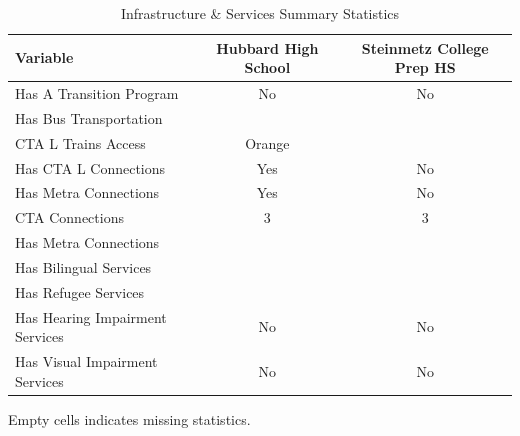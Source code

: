 \begin{table}[H]
\renewcommand{\arraystretch}{1.5}
\caption*{
{\large Infrastructure \& Services Summary Statistics}
} 

\fontsize{10pt}{11pt}\selectfont

\begin{tabular*}{\linewidth}{@{\extracolsep{\fill}}lcc}
\toprule
Variable & Hubbard High School & Steinmetz College Prep HS \\ 
\midrule\addlinespace[2.5pt]
Has A Transition Program & No & No \\
Has Bus Transportation &  &  \\
CTA L Trains Access & Orange &  \\
Has CTA L Connections & Yes & No \\
Has Metra Connections & Yes & No \\
CTA Connections & 3 & 3 \\
Has Metra Connections &  &  \\
Has Bilingual Services &  &  \\
Has Refugee Services &  &  \\
Has Hearing Impairment Services & No & No \\
Has Visual Impairment Services & No & No \\
\bottomrule
\end{tabular*}
\begin{minipage}{\linewidth}
Empty cells indicates missing statistics.\\
\end{minipage}
\end{table}
